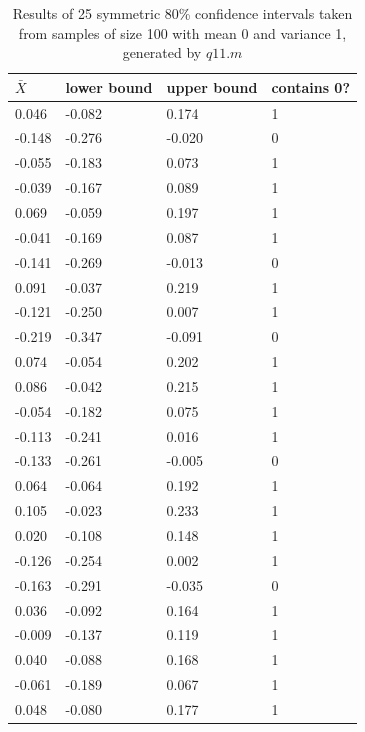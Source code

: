 \documentclass[10pt,a4paper]{report}
\begin{document}
\begin{table}[ht]
\centering
\begin{tabular}{|l|l|l|l|}
\hline
$\bar{X}$   & lower bound  & upper bound  & contains 0?\\ \hline
0.046  & -0.082 & 0.174  & 1        \\ \hline
-0.148 & -0.276 & -0.020 & 0        \\ \hline
-0.055 & -0.183 & 0.073  & 1        \\ \hline
-0.039 & -0.167 & 0.089  & 1        \\ \hline
0.069  & -0.059 & 0.197  & 1        \\ \hline
-0.041 & -0.169 & 0.087  & 1        \\ \hline
-0.141 & -0.269 & -0.013 & 0        \\ \hline
0.091  & -0.037 & 0.219  & 1        \\ \hline
-0.121 & -0.250 & 0.007  & 1        \\ \hline
-0.219 & -0.347 & -0.091 & 0        \\ \hline
0.074  & -0.054 & 0.202  & 1        \\ \hline
0.086  & -0.042 & 0.215  & 1        \\ \hline
-0.054 & -0.182 & 0.075  & 1        \\ \hline
-0.113 & -0.241 & 0.016  & 1        \\ \hline
-0.133 & -0.261 & -0.005 & 0        \\ \hline
0.064  & -0.064 & 0.192  & 1        \\ \hline
0.105  & -0.023 & 0.233  & 1        \\ \hline
0.020  & -0.108 & 0.148  & 1        \\ \hline
-0.126 & -0.254 & 0.002  & 1        \\ \hline
-0.163 & -0.291 & -0.035 & 0        \\ \hline
0.036  & -0.092 & 0.164  & 1        \\ \hline
-0.009 & -0.137 & 0.119  & 1        \\ \hline
0.040  & -0.088 & 0.168  & 1        \\ \hline
-0.061 & -0.189 & 0.067  & 1        \\ \hline
0.048  & -0.080 & 0.177  & 1        \\ \hline
\end{tabular}
\caption{Results of 25 symmetric 80\% confidence intervals taken from samples of size 100 with mean 0 and variance 1, generated by $q11.m$}
\end{table}
\end{document}
